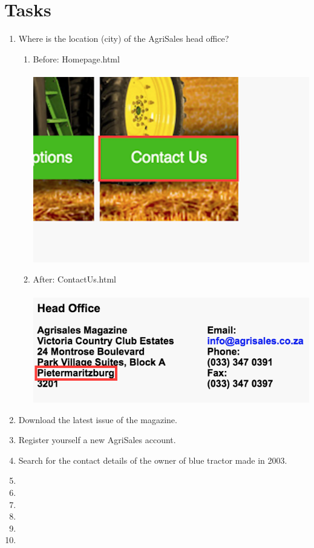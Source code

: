 \documentclass[11pt]{article}
\begin{document}
\section{Tasks}
	\begin{enumerate}
		\item Where is the location (city) of the AgriSales head office?
				\begin{enumerate}
					\item Before: Homepage.html \\ \\
						\includegraphics[width=0.5\linewidth]{../Images/Tasks/Task1Before}
					\item After: ContactUs.html \\ \\
						\includegraphics[width=0.5\linewidth]{../Images/Tasks/Task1After}
				\end{enumerate}
		\item Download the latest issue of the magazine.
		\item Register yourself a new AgriSales account.
		\item Search for the contact details of the owner of blue tractor made in 2003.
		\item 
		\item 
		\item 
		\item 
		\item 
		\item 
	\end{enumerate}
\end{document}
